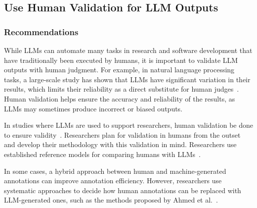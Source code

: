 



\subsection{Use Human Validation for LLM Outputs}

\subsubsection{Recommendations}


While LLMs can automate many tasks in research and software development that have traditionally been executed by humans, it is important to validate LLM outputs with human judgment.
For example, in natural language processing tasks, a large-scale study has shown that LLMs have significant variation in their results, which limits their reliability as a direct substitute for human judges~\cite{DBLP:journals/corr/abs-2406-18403}. 
Human validation helps ensure the accuracy and reliability of the results, as LLMs may sometimes produce incorrect or biased outputs.

In studies where LLMs are used to support researchers, human validation \must be done to ensure validity~\cite{DBLP:conf/chi/Wang0RMM24}.
Researchers \should plan for validation in humans from the outset and develop their methodology with this validation in mind.
Researchers \should use established reference models for comparing humans with LLMs~\cite{Schneider2025ReferenceModel}.

In some cases, a hybrid approach between human and machine-generated annotations can improve annotation efficiency.
However, researchers \should use systematic approaches to decide how human annotations can be replaced with LLM-generated ones, such as the methods proposed by Ahmed et al.~\cite{DBLP:journals/corr/abs-2408-05534}.


